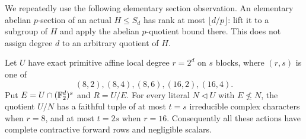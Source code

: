 We repeatedly use the following elementary section observation.
An elementary abelian $p$-section of an actual $H\leq S_d$ has
rank at most $\lfloor d/p\rfloor$: lift it to a subgroup of $H$
and apply the abelian $p$-quotient bound there. This does not assign
degree $d$ to an arbitrary quotient of $H$.

\begin{theorem}
\label{thm:binary-affine-exceptions}
Let $U$ have exact primitive affine local degree $r=2^d$ on $s$
blocks, where $(r,s)$ is one of
\[
 (8,2),(8,4),(8,6),(16,2),(16,4).
\]
Put $E=U\cap(\mathbb F_2^d)^s$ and $R=U/E$. For every literal
$N\lhd U$ with $E\not\leq N$, the quotient $U/N$ has a faithful
tuple of at most $t=s$ irreducible complex characters when $r=8$,
and at most $t=2s$ when $r=16$. Consequently all these actions
have complete contractive forward rows and negligible scalars.
\end{theorem}
